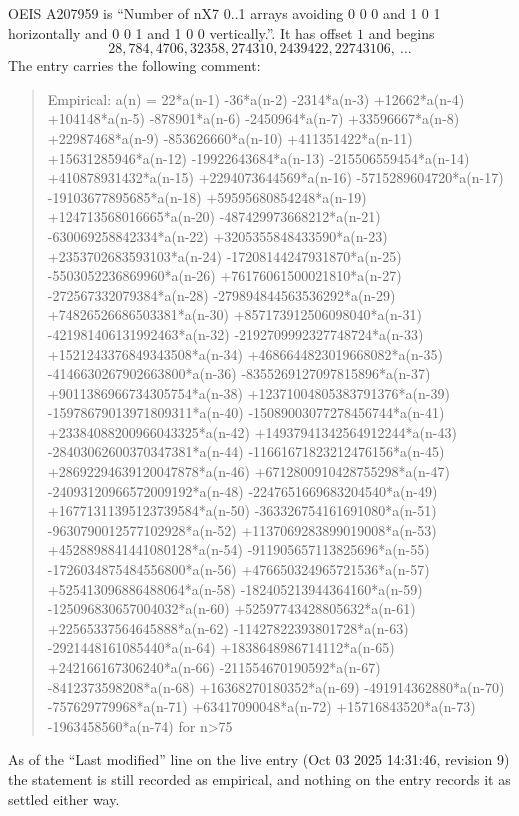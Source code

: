 \documentclass[11pt,a4paper]{article}
\theoremstyle{plain}
\theoremstyle{definition}
\begin{document}
OEIS A207959 is ``Number of nX7 0..1 arrays avoiding 0 0 0 and 1 0 1 horizontally and 0 0 1 and 1 0 0 vertically.''. It has offset
$1$ and begins
\[
28, 784, 4706, 32358, 274310, 2439422, 22743106,\ \dots
\]
The entry carries the following comment:
\begin{quote}\small
Empirical: a(n) = 22*a(n-1) -36*a(n-2) -2314*a(n-3) +12662*a(n-4) +104148*a(n-5) -878901*a(n-6) -2450964*a(n-7) +33596667*a(n-8) +22987468*a(n-9) -853626660*a(n-10) +411351422*a(n-11) +15631285946*a(n-12) -19922643684*a(n-13) -215506559454*a(n-14) +410878931432*a(n-15) +2294073644569*a(n-16) -5715289604720*a(n-17) -19103677895685*a(n-18) +59595680854248*a(n-19) +124713568016665*a(n-20) -487429973668212*a(n-21) -630069258842334*a(n-22) +3205355848433590*a(n-23) +2353702683593103*a(n-24) -17208144247931870*a(n-25) -5503052236869960*a(n-26) +76176061500021810*a(n-27) -272567332079384*a(n-28) -279894844563536292*a(n-29) +74826526686503381*a(n-30) +857173912506098040*a(n-31) -421981406131992463*a(n-32) -2192709992327748724*a(n-33) +1521243376849343508*a(n-34) +4686644823019668082*a(n-35) -4146630267902663800*a(n-36) -8355269127097815896*a(n-37) +9011386966734305754*a(n-38) +12371004805383791376*a(n-39) -15978679013971809311*a(n-40) -15089003077278456744*a(n-41) +23384088200966043325*a(n-42) +14937941342564912244*a(n-43) -28403062600370347381*a(n-44) -11661671823212476156*a(n-45) +28692294639120047878*a(n-46) +6712800910428755298*a(n-47) -24093120966572009192*a(n-48) -2247651669683204540*a(n-49) +16771311395123739584*a(n-50) -363326754161691080*a(n-51) -9630790012577102928*a(n-52) +1137069283899019008*a(n-53) +4528898841441080128*a(n-54) -911905657113825696*a(n-55) -1726034875484556800*a(n-56) +476650324965721536*a(n-57) +525413096886488064*a(n-58) -182405213944364160*a(n-59) -125096830657004032*a(n-60) +52597743428805632*a(n-61) +22565337564645888*a(n-62) -11427822393801728*a(n-63) -2921448161085440*a(n-64) +1838648986714112*a(n-65) +242166167306240*a(n-66) -211554670190592*a(n-67) -8412373598208*a(n-68) +16368270180352*a(n-69) -491914362880*a(n-70) -757629779968*a(n-71) +63417090048*a(n-72) +15716843520*a(n-73) -1963458560*a(n-74) for n>75
\end{quote}
As of the ``Last modified'' line on the live entry (Oct 03 2025 14:31:46, revision
9) the statement is still recorded as empirical, and nothing on the entry
records it as settled either way.
\end{document}
